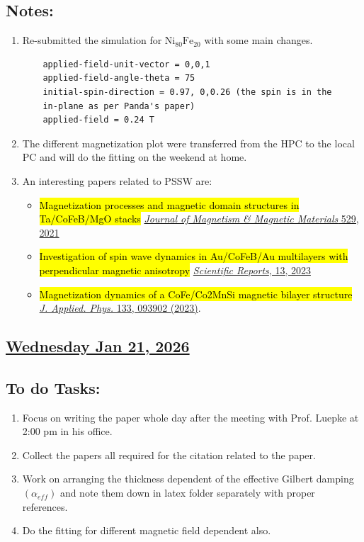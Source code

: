 \subsection*{Notes:}
\label{Notes:jan20notes}
\begin{enumerate}
    \item Re-submitted the simulation for $\mathrm{Ni_{80}Fe_{20}}$ with some main changes. 
    \begin{verbatim}
    applied-field-unit-vector = 0,0,1 
    applied-field-angle-theta = 75 
    initial-spin-direction = 0.97, 0,0.26 (the spin is in the 
    in-plane as per Panda's paper) 
    applied-field = 0.24 T 
    \end{verbatim}
    \item The different magnetization plot were transferred from the HPC to the local PC and will do the fitting on the weekend at home.
    \item An interesting papers related to PSSW are:
    \begin{itemize}
        \item \hl{Magnetization processes and magnetic domain structures in Ta/CoFeB/MgO stacks} \href{https://doi.org/10.1016/j.jmmm.2020.167699}{\textit{Journal of Magnetism \& Magnetic Materials} 529, 2021}
        \item \hl{Investigation of spin wave dynamics in Au/CoFeB/Au multilayers with perpendicular magnetic anisotropy} \href{https://www.nature.com/articles/s41598-023-49859-8}{\textit{Scientific Reports}, 13, 2023}
        \item \hl{Magnetization dynamics of a CoFe/Co2MnSi magnetic bilayer structure} \href{https://doi.org/10.1063/5.0128519} {\textit{J. Applied. Phys.} 133, 093902 (2023)}.
    \end{itemize}
\end{enumerate}
\subsection*{\underline{Wednesday Jan 21, 2026} }
\subsection*{To do Tasks:}
\begin{enumerate}
    \item Focus on writing the paper whole day after the meeting with Prof. Luepke at 2:00 pm in his office.
    \item Collect the papers all required for the citation related to the paper.
    \item Work on arranging the thickness dependent of the effective Gilbert damping $(\alpha_{eff})$ and note them down in latex folder separately with proper references.
        \item Do the fitting for different magnetic field dependent also.
\end{enumerate}


